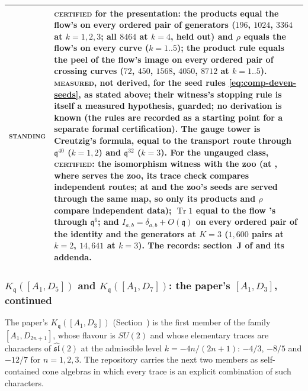\documentclass[11pt]{amsart}
\makeatletter
\DeclareMathOperator{\Tr}{Tr}
\newcommand\fq{\mathfrak{q}}
\newcommand\fsl{\mathfrak{sl}}
\theoremstyle{remark}
\newcommand{\pref}[1]{\@ifundefined{r@P-#1}{\textup{[\texttt{\detokenize{#1}}]}}{\ref{P-#1}}}
\newcommand{\CERTIFIED}{\textsc{certified}}
\newcommand{\MEASURED}{\textsc{measured}}
\newenvironment{machinery}{%
  \leavevmode\par\medskip\noindent
  \begin{tabular}{@{}>{\scshape}p{2.1cm}>{\raggedright\arraybackslash}p{\dimexpr\linewidth-2.5cm\relax}@{}}\toprule}%
  {\bottomrule\end{tabular}\par\medskip}
\makeatother
\begin{document}
\begin{machinery}
standing & \CERTIFIED{} for the presentation: the products equal the flow's on every ordered pair of generators ($196$, $1024$, $3364$ at $k=1,2,3$; all $8464$ at $k=4$, held out) and $\rho$ equals the flow's on every curve ($k=1..5$); the product rule equals the peel of the flow's image on every ordered pair of crossing curves ($72$, $450$, $1568$, $4050$, $8712$ at $k=1..5$).  \MEASURED{}, not derived, for the seed rules \eqref{eq:comp-deven-seeds}, as stated above; their witness's stopping rule is itself a measured hypothesis, guarded; no derivation is known (the rules are recorded as a starting point for a separate formal certification).  The gauge tower is Creutzig's formula, equal to the transport route through $\fq^{40}$ ($k=1,2$) and $\fq^{32}$ ($k=3$).  For the ungauged class, \CERTIFIED{}: the isomorphism witness with the zoo (at \code{a1d4}, where \code{SU3ADKAlg} serves the zoo, its trace check compares independent routes; at \code{a1d6} and \code{a1d8} the zoo's seeds are served through the same map, so only its products and $\rho$ compare independent data); $\Tr1$ equal to the flow \code{A1DevenRGKAlgebra(k)}'s through $\fq^6$; and $I_{a,b}=\delta_{a,b}+O(\fq)$ on every ordered pair of the identity and the generators at $K=3$ ($1{,}600$ pairs at $k=2$, $14{,}641$ at $k=3$).  The records: section~J of \file{notes/finite_type_trace_machinery.md} and its addenda. \\
\end{machinery}

\subsubsection{$K_\fq([A_1,D_5])$ and $K_\fq([A_1,D_7])$: the paper's $[A_1,D_3]$, continued}\label{comp:a1dodd}
\begin{sloppypar}
The paper's $K_\fq([A_1,D_3])$ (Section~\pref{sec:a1d3}) is the first member
of the family $[A_1,D_{2n+1}]$, whose flavour is $SU(2)$ and whose
elementary traces are characters of $\widehat{\fsl}(2)$ at the admissible
level $k=-4n/(2n+1)$: $-4/3$, $-8/5$ and $-12/7$ for $n=1,2,3$.  The
repository carries the next two members as self-contained cone algebras in
which every trace is an explicit combination of such characters.
\end{sloppypar}
\end{document}
